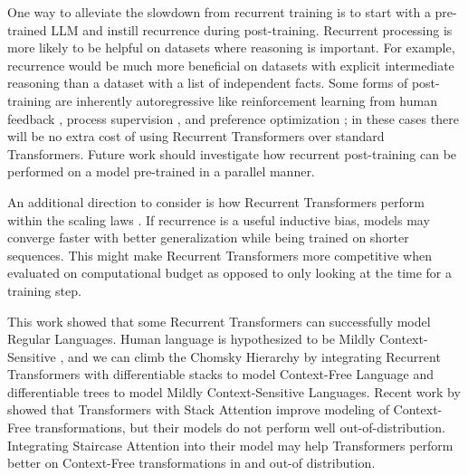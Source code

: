     One way to alleviate the slowdown from recurrent training is to start with a pre-trained LLM and instill recurrence during post-training. Recurrent processing is more likely to be helpful on datasets where reasoning is important. For example, recurrence would be much more beneficial on datasets with explicit intermediate reasoning \citep{nye_show_2021, wei_chain_2022} than a dataset with a list of independent facts. Some forms of post-training are inherently autoregressive like reinforcement learning from human feedback \citep{christiano_deep_2017}, process supervision \citep{lightman_lets_2024}, and preference optimization \citep{pang_iterative_2024}; in these cases there will be no extra cost of using Recurrent Transformers over standard Transformers. Future work should investigate how recurrent post-training can be performed on a model pre-trained in a parallel manner.
    
    An additional direction to consider is how Recurrent Transformers perform within the scaling laws \citep{kaplan_scaling_2020, hoffmann_training_2022}. If recurrence is a useful inductive bias, models may converge faster with better generalization while being trained on shorter sequences. This might make Recurrent Transformers more competitive when evaluated on computational budget as opposed to only looking at the time for a training step.
    
    This work showed that some Recurrent Transformers can successfully model Regular Languages. Human language is hypothesized to be Mildly Context-Sensitive \citep{joshi_tree_1985, joshi_convergence_1990}, and we can climb the Chomsky Hierarchy \citep{chomsky_three_1956, chomsky_certain_1959} by integrating Recurrent Transformers with differentiable stacks \citep{joulin_inferring_2015, grefenstette2015learning} to model Context-Free Language and differentiable trees \citep{pmlr-v202-soulos23a} to model Mildly Context-Sensitive Languages. Recent work by \citet{dusell2024stack} showed that Transformers with Stack Attention improve modeling of Context-Free transformations, but their models do not perform well out-of-distribution. Integrating Staircase Attention into their model may help Transformers perform better on Context-Free transformations in and out-of distribution.
    